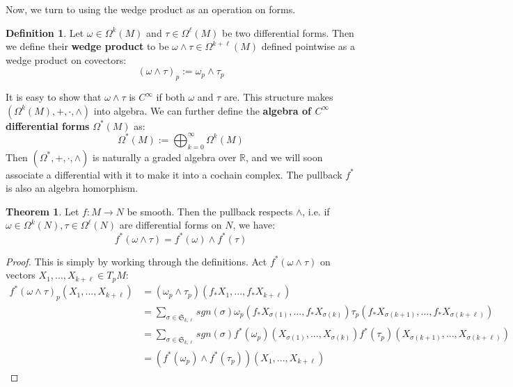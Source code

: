 \documentclass[11pt, oneside]{article}   	%
\theoremstyle{definition}
\newtheorem{definition}{Definition}[section]
\newtheorem{theorem}{Theorem}[section]
\begin{document}
Now, we turn to using the wedge product as an operation on forms. 
\begin{definition}
	Let $\omega\in\Omega^k(M)$ and $\tau\in\Omega^\ell(M)$ be two differential forms. Then we define their \textbf{wedge 
	product} to be $\omega\wedge\tau\in\Omega^{k + \ell}(M)$ defined pointwise as a wedge product on covectors:
	\begin{equation}
		(\omega\wedge\tau)_p :=\omega_p\wedge\tau_p
	\end{equation}
\end{definition}
It is easy to show that $\omega\wedge\tau$ is $C^\infty$ if both $\omega$ and $\tau$ are. This structure makes 
$(\Omega^k(M), +, \cdot, \wedge)$ into algebra. We can further define the \textbf{algebra of $C^\infty$ differential forms} 
$\Omega^*(M)$ as:
\begin{equation}
	\Omega^*(M) := \bigoplus_{k = 0}^\infty\Omega^k(M)
\end{equation}
Then $(\Omega^*, +, \cdot, \wedge)$ is naturally a graded algebra over $\mathbb R$, and we will soon associate a differential 
with it to make it into a cochain complex. The pullback $f^*$ is also an algebra homorphism.
\begin{theorem}
	Let $f : M\rightarrow N$ be smooth. Then the pullback respects $\wedge$, i.e. if $\omega\in\Omega^k(N), 
	\tau\in\Omega^\ell(N)$ are differential forms on $N$, we have:
	\begin{equation}
		f^*(\omega\wedge\tau) = f^*(\omega)\wedge f^*(\tau)
	\end{equation}
\end{theorem}
\begin{proof}
	This is simply by working through the definitions. Act $f^*(\omega\wedge\tau)$ on vectors $X_1, ..., X_{k + \ell}\in T_p M$:
	\begin{align}
		f^*(\omega\wedge\tau)_p(X_1, ..., X_{k + \ell}) &= (\omega_p\wedge\tau_p)(f_* X_1, ..., f_* X_{k + \ell})\\
		&= \sum_{\sigma\in\mathfrak S_{k, \ell}}sgn(\sigma) \omega_p(f_* X_{\sigma(1)}, ..., f_* X_{\sigma(k)})
		\tau_p(f_* X_{\sigma(k + 1)}, ..., f_* X_{\sigma(k + \ell)}) \\
		&= \sum_{\sigma\in\mathfrak S_{k, \ell}}sgn(\sigma) f^*(\omega_p)(X_{\sigma(1)}, ..., X_{\sigma(k)})f^*(\tau_p)
		(X_{\sigma(k + 1)}, ..., X_{\sigma(k + \ell)}) \\
		&= (f^*(\omega_p)\wedge f^*(\tau_p))(X_1, ..., X_{k + \ell})
	\end{align}
\end{proof}
\end{document}
